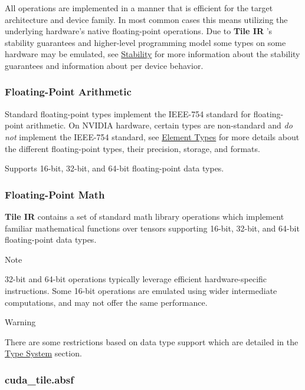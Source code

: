 \documentclass{article}
\begin{document}
All operations are implemented in a manner that is efficient for the target architecture and device family. In most common cases this means utilizing the underlying hardware's native floating-point operations. Due to \textbf{Tile IR} 's stability guarantees and higher-level programming model some types on some hardware may be emulated, see \href{https://docs.nvidia.com/cuda/tile-ir/latest/sections/stability.html#section-stability}{Stability} for more information about the stability guarantees and information about per device behavior.


\subsubsection{Floating-Point Arithmetic}

Standard floating-point types implement the IEEE-754 standard for floating-point arithmetic. On NVIDIA hardware, certain types are non-standard and \textit{do not} implement the IEEE-754 standard, see \href{https://docs.nvidia.com/cuda/tile-ir/latest/sections/types.html#subsection-element-types}{Element Types} for more details about the different floating-point types, their precision, storage, and formats.


Supports 16-bit, 32-bit, and 64-bit floating-point data types.



\subsubsection{Floating-Point Math}

\textbf{Tile IR} contains a set of standard math library operations which implement familiar mathematical functions over tensors supporting 16-bit, 32-bit, and 64-bit floating-point data types.


Note


32-bit and 64-bit operations typically leverage efficient hardware-specific instructions. Some 16-bit operations are emulated using wider intermediate computations, and may not offer the same performance.



Warning


There are some restrictions based on data type support which are detailed in the \href{https://docs.nvidia.com/cuda/tile-ir/latest/sections/types.html#section-types}{Type System} section.



\subsubsection{cuda\_tile.absf}
\end{document}
